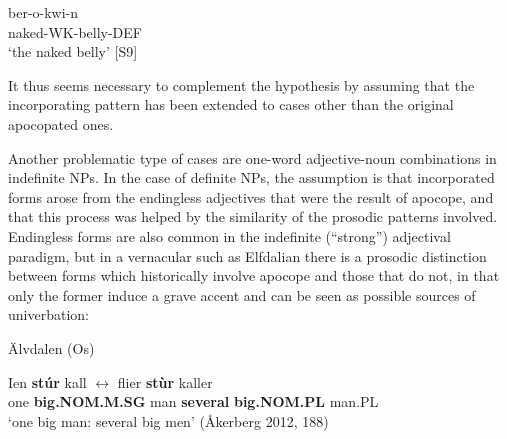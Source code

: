 
 \ea\label{}
\gll ber-o-kwi-n\\


naked-WK-belly-DEF\\

\glt ‘the naked belly’ [S9]

\z

It thus seems necessary to complement the hypothesis by assuming that the incorporating pattern has been extended to cases other than the original apocopated ones.


Another problematic type of cases are one-word adjective-noun combinations in indefinite NPs. In the case of definite NPs, the assumption is that incorporated forms arose from the endingless adjectives that were the result of apocope, and that this process was helped by the similarity of the prosodic patterns involved. Endingless forms are also common in the indefinite (“strong”) adjectival paradigm, but in a vernacular such as Elfdalian there is a prosodic distinction between forms which historically involve apocope and those that do not, in that only the former induce a grave accent and can be seen as possible sources of univerbation:


\item 

Älvdalen (Os) 



 \ea\label{}
\gll Ien  \textbf{stúr} kall   \textbf{$\leftrightarrow $} flier\textbf{  stùr} kaller\\


one  \textbf{big.NOM.M.SG} man   \textbf{several} \textbf{big.NOM.PL} man.PL\\

\glt ‘one big man: several big men’ (Åkerberg 2012, 188)

\z

